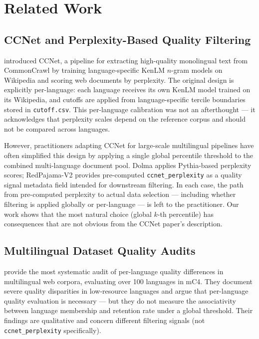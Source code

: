 \section{Related Work}
\label{sec:related}

\subsection{CCNet and Perplexity-Based Quality Filtering}

\citet{Wenzek2019CCNet} introduced CCNet, a pipeline for extracting high-quality monolingual text from CommonCrawl by training language-specific KenLM $n$-gram models on Wikipedia and scoring web documents by perplexity. The original design is explicitly per-language: each language receives its own KenLM model trained on its Wikipedia, and cutoffs are applied from language-specific tercile boundaries stored in \texttt{cutoff.csv}. This per-language calibration was not an afterthought --- it acknowledges that perplexity scales depend on the reference corpus and should not be compared across languages.

However, practitioners adapting CCNet for large-scale multilingual pipelines have often simplified this design by applying a single global percentile threshold to the combined multi-language document pool. Dolma \cite{Soldaini2024Dolma} applies Pythia-based perplexity scores; RedPajama-V2 \cite{Weber2024RedPajama} provides pre-computed \texttt{ccnet\_perplexity} as a quality signal metadata field intended for downstream filtering. In each case, the path from pre-computed perplexity to actual data selection --- including whether filtering is applied globally or per-language --- is left to the practitioner. Our work shows that the most natural choice (global $k$-th percentile) has consequences that are not obvious from the CCNet paper's description.

\subsection{Multilingual Dataset Quality Audits}

\citet{Caswell2021Quality} provide the most systematic audit of per-language quality differences in multilingual web corpora, evaluating over 100 languages in mC4. They document severe quality disparities in low-resource languages and argue that per-language quality evaluation is necessary --- but they do not measure the associativity between language membership and retention rate under a global threshold. Their findings are qualitative and concern different filtering signals (not \texttt{ccnet\_perplexity} specifically).

